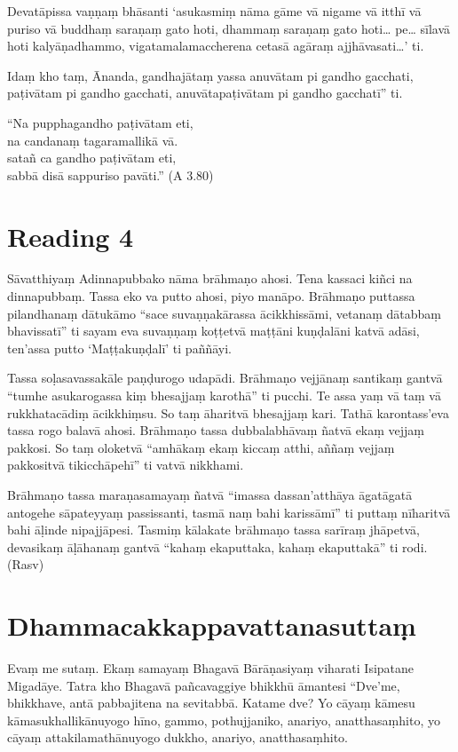 Devatāpissa vaṇṇaṃ bhāsanti ‘asukasmiṃ nāma gāme vā nigame vā itthī vā puriso vā buddhaṃ saraṇaṃ gato hoti, dhammaṃ saraṇaṃ gato hoti… pe… sīlavā hoti kalyāṇadhammo, vigatamalamaccherena cetasā agāraṃ ajjhāvasati…’ ti.

Idaṃ kho taṃ, Ānanda, gandhajātaṃ yassa anuvātam pi gandho gacchati, paṭivātam pi gandho gacchati, anuvātapaṭivātam pi gandho gacchatī” ti.

“Na pupphagandho paṭivātam eti,\\
na candanaṃ tagaramallikā vā.\\
satañ ca gandho paṭivātam eti,\\
sabbā disā sappuriso pavāti.” (A 3.80)

\section*{Reading 4}

Sāvatthiyaṃ Adinnapubbako nāma brāhmaṇo ahosi. Tena kassaci kiñci na dinnapubbaṃ. Tassa eko va putto ahosi, piyo manāpo. Brāhmaṇo puttassa pilandhanaṃ dātukāmo “sace suvaṇṇakārassa ācikkhissāmi, vetanaṃ dātabbaṃ bhavissatī” ti sayam eva suvaṇṇaṃ koṭṭetvā maṭṭāni kuṇḍalāni katvā adāsi, ten’assa putto ‘Maṭṭakuṇḍalī’ ti paññāyi.

Tassa soḷasavassakāle paṇḍurogo udapādi. Brāhmaṇo vejjānaṃ santikaṃ gantvā “tumhe asukarogassa kiṃ bhesajjaṃ karothā” ti pucchi. Te assa yaṃ vā taṃ vā rukkhatacādiṃ ācikkhiṃsu. So taṃ āharitvā bhesajjaṃ kari. Tathā karontass’eva tassa rogo balavā ahosi. Brāhmaṇo tassa dubbalabhāvaṃ ñatvā ekaṃ vejjaṃ pakkosi. So taṃ oloketvā “amhākaṃ ekaṃ kiccaṃ atthi, aññaṃ vejjaṃ pakkositvā tikicchāpehī” ti vatvā nikkhami.

Brāhmaṇo tassa maraṇasamayaṃ ñatvā “imassa dassan’atthāya āgatāgatā antogehe sāpateyyaṃ passissanti, tasmā naṃ bahi karissāmī” ti puttaṃ nīharitvā bahi āḷinde nipajjāpesi. Tasmiṃ kālakate brāhmaṇo tassa sarīraṃ jhāpetvā, devasikaṃ āḷāhanaṃ gantvā “kahaṃ ekaputtaka, kahaṃ ekaputtakā” ti rodi. (Rasv)

\section*{Dhammacakkappavattanasuttaṃ}

Evaṃ me sutaṃ. Ekaṃ samayaṃ Bhagavā Bārāṇasiyaṃ viharati Isipatane Migadāye. Tatra kho Bhagavā pañcavaggiye bhikkhū āmantesi “Dve’me, bhikkhave, antā pabbajitena na sevitabbā. Katame dve? Yo cāyaṃ kāmesu kāmasukhallikānuyogo hīno, gammo, pothujjaniko, anariyo, anatthasaṃhito, yo cāyaṃ attakilamathānuyogo dukkho, anariyo, anatthasaṃhito.

